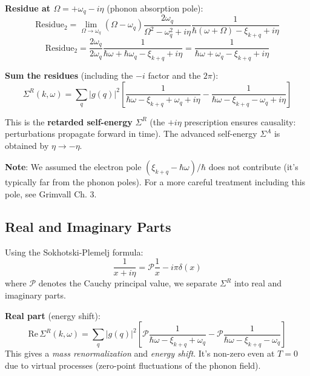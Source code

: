 \documentclass[12pt]{article}
\begin{document}
\textbf{Residue at $\Omega = +\omega_q - i\eta$} (phonon absorption pole):
\begin{equation}
\text{Residue}_2 = \lim_{\Omega \to \omega_q} (\Omega - \omega_q) \frac{2\omega_q}{\Omega^2 - \omega_q^2 + i\eta} \frac{1}{\hbar(\omega+\Omega) - \xi_{k+q} + i\eta}
\end{equation}
\begin{equation}
\text{Residue}_2 = \frac{2\omega_q}{2\omega_q} \frac{1}{\hbar\omega + \hbar\omega_q - \xi_{k+q} + i\eta} = \frac{1}{\hbar\omega + \omega_q - \xi_{k+q} + i\eta}
\end{equation}

\textbf{Sum the residues} (including the $-i$ factor and the $2\pi$):
\begin{equation}
\boxed{
\Sigma^R(k,\omega) = \sum_q |g(q)|^2 \left[\frac{1}{\hbar\omega - \xi_{k+q} + \omega_q + i\eta} - \frac{1}{\hbar\omega - \xi_{k+q} - \omega_q + i\eta}\right]
}
\end{equation}

This is the \textbf{retarded self-energy} $\Sigma^R$ (the $+i\eta$ prescription ensures causality: perturbations propagate forward in time). The advanced self-energy $\Sigma^A$ is obtained by $\eta \to -\eta$.

\textbf{Note}: We assumed the electron pole $(\xi_{k+q} - \hbar\omega)/\hbar$ does not contribute (it's typically far from the phonon poles). For a more careful treatment including this pole, see Grimvall Ch. 3.

\subsection{Real and Imaginary Parts}

Using the Sokhotski-Plemelj formula:
\begin{equation}
\frac{1}{x + i\eta} = \mathcal{P}\frac{1}{x} - i\pi\delta(x)
\end{equation}
where $\mathcal{P}$ denotes the Cauchy principal value, we separate $\Sigma^R$ into real and imaginary parts.

\textbf{Real part} (energy shift):
\begin{equation}
\boxed{
\text{Re}\,\Sigma^R(k,\omega) = \sum_q |g(q)|^2 \left[\mathcal{P}\frac{1}{\hbar\omega - \xi_{k+q} + \omega_q} - \mathcal{P}\frac{1}{\hbar\omega - \xi_{k+q} - \omega_q}\right]
}
\end{equation}
This gives a \textit{mass renormalization} and \textit{energy shift}. It's non-zero even at $T=0$ due to virtual processes (zero-point fluctuations of the phonon field).
\end{document}
